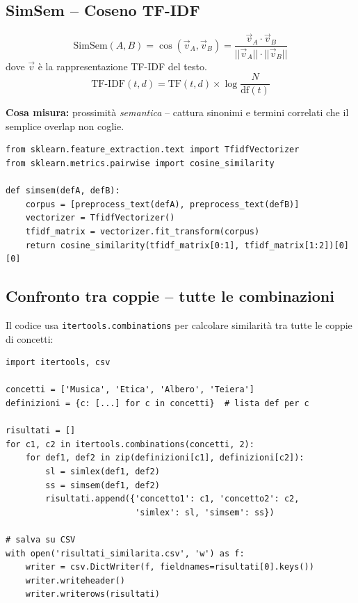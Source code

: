 \documentclass[12pt,a4paper]{article}
\begin{document}
\subsection{SimSem -- Coseno TF-IDF}

\begin{formulabox}
\[
\text{SimSem}(A, B) = \cos(\vec{v}_A, \vec{v}_B) = \frac{\vec{v}_A \cdot \vec{v}_B}{||\vec{v}_A|| \cdot ||\vec{v}_B||}
\]
dove $\vec{v}$ \`e la rappresentazione TF-IDF del testo.
\[
\text{TF-IDF}(t, d) = \text{TF}(t,d) \times \log\frac{N}{\text{df}(t)}
\]
\end{formulabox}

\textbf{Cosa misura:} prossimit\`a \emph{semantica} -- cattura sinonimi e termini correlati che il semplice overlap non coglie.

\begin{codebox}
\begin{lstlisting}[style=python]
from sklearn.feature_extraction.text import TfidfVectorizer
from sklearn.metrics.pairwise import cosine_similarity

def simsem(defA, defB):
    corpus = [preprocess_text(defA), preprocess_text(defB)]
    vectorizer = TfidfVectorizer()
    tfidf_matrix = vectorizer.fit_transform(corpus)
    return cosine_similarity(tfidf_matrix[0:1], tfidf_matrix[1:2])[0][0]
\end{lstlisting}
\end{codebox}

\subsection{Confronto tra coppie -- tutte le combinazioni}

Il codice usa \texttt{itertools.combinations} per calcolare similarit\`a tra tutte le coppie di concetti:

\begin{codebox}
\begin{lstlisting}[style=python]
import itertools, csv

concetti = ['Musica', 'Etica', 'Albero', 'Teiera']
definizioni = {c: [...] for c in concetti}  # lista def per c

risultati = []
for c1, c2 in itertools.combinations(concetti, 2):
    for def1, def2 in zip(definizioni[c1], definizioni[c2]):
        sl = simlex(def1, def2)
        ss = simsem(def1, def2)
        risultati.append({'concetto1': c1, 'concetto2': c2,
                          'simlex': sl, 'simsem': ss})

# salva su CSV
with open('risultati_similarita.csv', 'w') as f:
    writer = csv.DictWriter(f, fieldnames=risultati[0].keys())
    writer.writeheader()
    writer.writerows(risultati)
\end{lstlisting}
\end{codebox}
\end{document}
